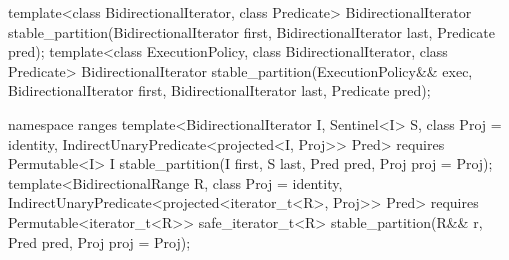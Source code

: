 %
\begin{itemdecl}
template<class BidirectionalIterator, class Predicate>
  BidirectionalIterator
    stable_partition(BidirectionalIterator first, BidirectionalIterator last, Predicate pred);
template<class ExecutionPolicy, class BidirectionalIterator, class Predicate>
  BidirectionalIterator
    stable_partition(ExecutionPolicy&& exec,
                     BidirectionalIterator first, BidirectionalIterator last, Predicate pred);
\end{itemdecl}
\begin{addedblock}
\begin{itemdecl}
namespace ranges {
  template<BidirectionalIterator I, Sentinel<I> S, class Proj = identity,
      IndirectUnaryPredicate<projected<I, Proj>> Pred>
    requires Permutable<I>
    I stable_partition(I first, S last, Pred pred, Proj proj = Proj{});
  template<BidirectionalRange R, class Proj = identity,
      IndirectUnaryPredicate<projected<iterator_t<R>, Proj>> Pred>
    requires Permutable<iterator_t<R>>
    safe_iterator_t<R> stable_partition(R&& r, Pred pred, Proj proj = Proj{});
}
\end{itemdecl}
\end{addedblock}

